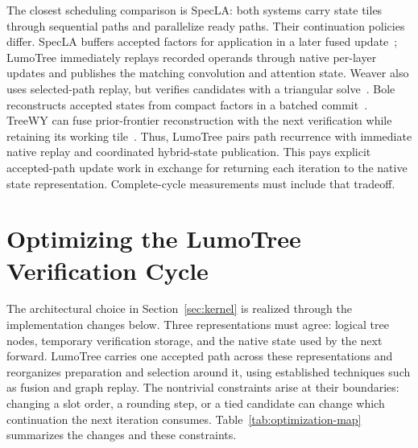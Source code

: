 \documentclass[conference]{IEEEtran}
\newcommand{\sys}{LumoTree}
\begin{document}
The closest scheduling comparison is SpecLA: both systems carry state tiles through sequential paths and parallelize ready paths. Their continuation policies differ. SpecLA buffers accepted factors for application in a later fused update~\cite{wang2026specla}; \sys{} immediately replays recorded operands through native per-layer updates and publishes the matching convolution and attention state. Weaver also uses selected-path replay, but verifies candidates with a triangular solve~\cite{oda2026marginals}. Bole reconstructs accepted states from compact factors in a batched commit~\cite{wang2026bole}. TreeWY can fuse prior-frontier reconstruction with the next verification while retaining its working tile~\cite{ghantasala2026treewycode}. Thus, \sys{} pairs path recurrence with immediate native replay and coordinated hybrid-state publication. This pays explicit accepted-path update work in exchange for returning each iteration to the native state representation. Complete-cycle measurements must include that tradeoff.

\section{Optimizing the LumoTree Verification Cycle}
\label{sec:optimization}
The architectural choice in Section~\ref{sec:kernel} is realized through the implementation changes below. Three representations must agree: logical tree nodes, temporary verification storage, and the native state used by the next forward. \sys{} carries one accepted path across these representations and reorganizes preparation and selection around it, using established techniques such as fusion and graph replay. The nontrivial constraints arise at their boundaries: changing a slot order, a rounding step, or a tied candidate can change which continuation the next iteration consumes. Table~\ref{tab:optimization-map} summarizes the changes and these constraints.
\end{document}
